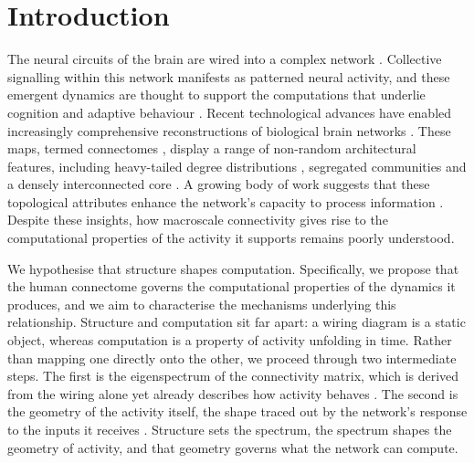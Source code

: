 \chapter{Introduction}
\label{chapter:introduction}

The neural circuits of the brain are wired into a complex network \cite{sporns2010networks}. 
Collective signalling within this network manifests as patterned neural activity, 
and these emergent dynamics are thought to support the computations that underlie cognition 
and adaptive behaviour \cite{gerstner1945neuronal,chialvo2010emergent,ju2020dynamic}. Recent technological 
advances have enabled increasingly comprehensive reconstructions of biological brain networks 
\cite{vanessen2012human,glasser2016human,elam2021human}. 
These maps, termed connectomes \cite{sporns2005human,sporns2011human,sporns2013human}, 
display a range of non-random architectural features, including heavy-tailed degree distributions 
\cite{hagmann2008mapping,sporns2007identification}, segregated communities 
\cite{betzel2017modular,bertolero2015modular,power2011functional} and a densely interconnected core 
\cite{zamora2010cortical,van2012high,towlson2013rich}. 
A growing body of work suggests that these topological attributes enhance the network's capacity 
to process information \cite{van2016comparative,bassett2017network}. Despite these insights, how macroscale connectivity gives rise to the 
computational properties of the activity it supports remains poorly understood.

We hypothesise that structure shapes computation. Specifically, we propose that the human connectome 
governs the computational properties of the dynamics it produces, and we aim to characterise the 
mechanisms underlying this relationship. Structure and computation sit far apart: a wiring diagram 
is a static object, whereas computation is a property of activity unfolding in time. Rather than 
mapping one directly onto the other, we proceed through two intermediate steps. The first is the 
eigenspectrum of the connectivity matrix, which is derived from the wiring alone yet already 
describes how activity behaves \cite{rajan2010stimulus,christodoulou2022eigenvalue}. 
The second is the geometry of the activity itself, the shape traced out by the network's response 
to the inputs it receives \cite{ju2020dynamic,vyas2020computation}. Structure sets the spectrum, 
the spectrum shapes the geometry of activity, and that geometry governs what the network can compute.


